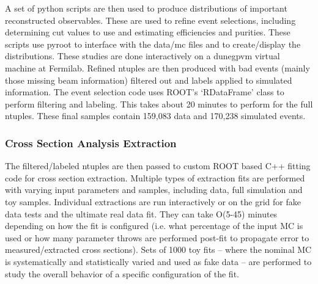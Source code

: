 \documentclass[../main-v1.tex]{subfiles}
\begin{document}
{A set of python scripts are then used to produce distributions of important reconstructed observables. These are used to refine event selections, including determining cut values to use and estimating efficiencies and purities. These scripts use pyroot to interface with the data/mc files and to create/display the distributions. These studies  are done interactively on a dunegpvm virtual machine at Fermilab.
Refined ntuples are then produced with bad events (mainly those missing beam information) filtered out and labels applied to simulated information. The event selection code uses ROOT’s `RDataFrame' class to perform filtering and labeling. This takes about 20 minutes to perform for the full ntuples.  These final samples contain 159,083 data and 170,238 simulated events. 

\subsubsection{Cross Section Analysis Extraction}

The filtered/labeled ntuples are then passed to custom  ROOT based C++ fitting code for cross section extraction. Multiple types of extraction fits are performed with varying input parameters and samples, including data, full simulation and toy samples.  
Individual extractions are run interactively or on the grid for fake data tests and the ultimate real data fit. They can take O(5-45) minutes depending on how the fit is configured (i.e. what percentage of the input MC is used or how many parameter throws are performed post-fit to propagate error to measured/extracted cross sections). Sets of 1000 toy fits – where the nominal MC is systematically and statistically varied and used as fake data – are performed to study the overall behavior of a specific configuration of the fit.

}





\end{document}
